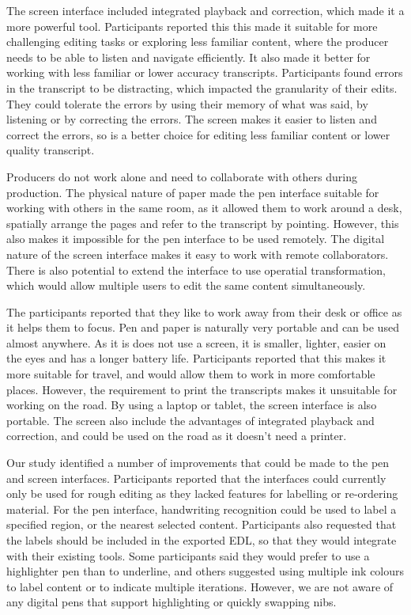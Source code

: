 The screen interface included integrated playback and correction, which made it a more powerful tool.  Participants
reported this this made it suitable for more challenging editing tasks or exploring less familiar content, where the
producer needs to be able to listen and navigate efficiently. It also made it better for working with less familiar or
lower accuracy transcripts. Participants found errors in the transcript to be distracting, which impacted the
granularity of their edits. They could tolerate the errors by using their memory of what was said, by listening or by
correcting the errors. The screen makes it easier to listen and correct the errors, so is a better choice for editing
less familiar content or lower quality transcript. 

Producers do not work alone and need to collaborate with others during production. The physical nature of paper made
the pen interface suitable for working with others in the same room, as it allowed them to work around a desk,
spatially arrange the pages and refer to the transcript by pointing. However, this also makes it impossible for the pen
interface to be used remotely. The digital nature of the screen interface makes it easy to work with remote
collaborators. There is also potential to extend the interface to use operatial transformation, which would allow
multiple users to edit the same content simultaneously.

The participants reported that they like to work away from their desk or office as it helps them to focus. Pen and
paper is naturally very portable and can be used almost anywhere. As it is does not use a screen, it is smaller,
lighter, easier on the eyes and has a longer battery life. Participants reported that this makes it more suitable for
travel, and would allow them to work in more comfortable places. However, the requirement to print the transcripts
makes it unsuitable for working on the road. By using a laptop or tablet, the screen interface is also portable. The
screen also include the advantages of integrated playback and correction, and could be used on the road as it doesn't
need a printer.

Our study identified a number of improvements that could be made to the pen and screen interfaces. Participants
reported that the interfaces could currently only be used for rough editing as they lacked features for labelling or
re-ordering material. For the pen interface, handwriting recognition could be used to label a specified region, or the
nearest selected content.  Participants also requested that the labels should be included in the exported EDL, so that
they would integrate with their existing tools.  Some participants said they would prefer to use a highlighter pen than
to underline, and others suggested using multiple ink colours to label content or to indicate multiple iterations.
However, we are not aware of any digital pens that support highlighting or quickly swapping nibs.

